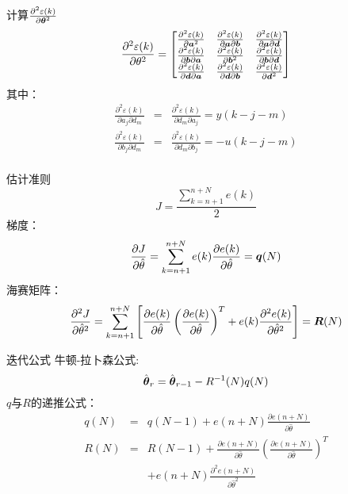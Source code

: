 \begin{frame}{计算$\frac{\partial^2\varepsilon(k)}{\partial\boldsymbol{\theta}^2}$}
$$
\frac{\partial^2\varepsilon(k)}{\partial\theta^2} = 
\begin{bmatrix}
\frac{\partial^2\varepsilon(k)}{\partial\boldsymbol{a}^2} & \frac{\partial^2\varepsilon(k)}{\partial\boldsymbol{a}\partial\boldsymbol{b}} & \frac{\partial^2\varepsilon(k)}{\partial\boldsymbol{a}\partial\boldsymbol{d}}  \\
\frac{\partial^2\varepsilon(k)}{\partial\boldsymbol{b}\partial\boldsymbol{a}} &\frac{\partial^2\varepsilon(k)}{\partial\boldsymbol{b}^2} &  \frac{\partial^2\varepsilon(k)}{\partial\boldsymbol{b}\partial\boldsymbol{d}} \\
\frac{\partial^2\varepsilon(k)}{\partial\boldsymbol{d}\partial\boldsymbol{a}} &  \frac{\partial^2\varepsilon(k)}{\partial\boldsymbol{d}\partial\boldsymbol{b}} &\frac{\partial^2\varepsilon(k)}{\partial\boldsymbol{d}^2} 
\end{bmatrix}
$$
其中：
\begin{eqnarray*}
\frac{\partial^2\varepsilon(k)}{\partial a_j\partial d_m} &=& \frac{\partial^2\varepsilon(k)}{\partial d_m\partial a_j} = y(k-j-m)  \\
\frac{\partial^2\varepsilon(k)}{\partial b_j\partial d_m} &=& \frac{\partial^2\varepsilon(k)}{\partial d_m\partial b_j} = -u(k-j-m)  \\
\end{eqnarray*}
\end{frame}

\begin{frame}{估计准则}
$$
J=\frac{\sum_{k=n+1}^{n+N}e(k)}{2}
$$
梯度：
$$\frac{\partial J}{\partial\hat\theta} = \sum_{k=n+1}^{n+N}e(k)\frac{\partial e(k)}{\partial\hat\theta}=\boldsymbol{q}(N)$$
海赛矩阵：
$$
\frac{\partial^2 J}{\partial\hat\theta^2} = \sum_{k=n+1}^{n+N}\left[\frac{\partial e(k)}{\partial\hat\theta}\left(\frac{\partial e(k)}{\partial \hat\theta}\right)^T + e(k)\frac{\partial^2 e(k)}{\partial \hat\theta^2} \right]=\boldsymbol{R}(N)
$$
\end{frame}

\begin{frame}{迭代公式}
牛顿-拉卜森公式:
$$
\hat{\boldsymbol{\theta}}_r=\hat{\boldsymbol{\theta}}_{r-1}-R^{-1}(N)q(N)
$$
$q$与$R$的递推公式：
\begin{eqnarray*}
q(N) &=& q(N-1)+e(n+N)\frac{\partial e(n+N)}{\partial\hat\theta}\\
R(N) &=& R(N-1) +\frac{\partial e(n+N)}{\partial\hat\theta}\left(\frac{\partial e(n+N)}{\partial\hat\theta}\right)^T \\
&& +e(n+N)\frac{\partial^2 e(n+N)}{\partial\hat\theta^2} 
\end{eqnarray*}
\end{frame}




